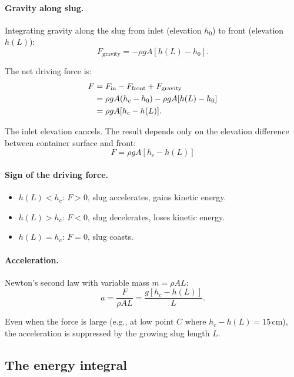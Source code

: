 \documentclass[11pt]{article}
\begin{document}
\paragraph{Gravity along slug.} Integrating gravity along the slug from inlet (elevation $h_0$) to front (elevation $h(L)$):
\[
  F_{\text{gravity}} = -\rho g A [h(L) - h_0].
\]

The net driving force is:
\begin{align}
  F &= F_{\text{in}} - F_{\text{front}} + F_{\text{gravity}} \notag \\
    &= \rho g A (h_c - h_0) - \rho g A [h(L) - h_0] \notag \\
    &= \rho g A [h_c - h(L)].
  \label{eq:driving-force}
\end{align}

The inlet elevation cancels. The result depends only on the elevation difference between container surface and front:
\begin{equation}
  \boxed{F = \rho g A [h_c - h(L)]}
  \label{eq:driving-force-boxed}
\end{equation}

\paragraph{Sign of the driving force.}
\begin{itemize}[nosep,leftmargin=2em]
  \item $h(L) < h_c$: $F > 0$, slug accelerates, gains kinetic energy.
  \item $h(L) > h_c$: $F < 0$, slug decelerates, loses kinetic energy.
  \item $h(L) = h_c$: $F = 0$, slug coasts.
\end{itemize}

\paragraph{Acceleration.} Newton's second law with variable mass $m = \rho A L$:
\begin{equation}
  a = \frac{F}{\rho A L} = \frac{g[h_c - h(L)]}{L}.
  \label{eq:acceleration}
\end{equation}

Even when the force is large (e.g., at low point $C$ where $h_c - h(L) = 15$\,cm), the acceleration is suppressed by the growing slug length $L$.

\subsection{The energy integral}
\end{document}
